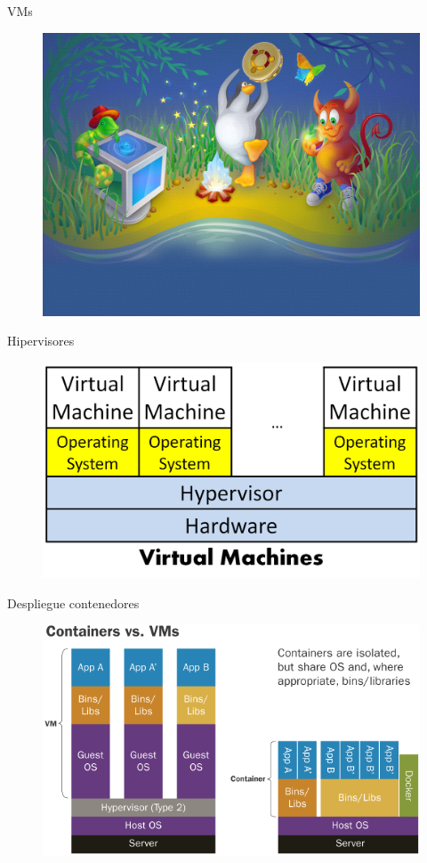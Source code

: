 \documentclass[aspectratio=169]{beamer}
\begin{document}
\begin{frame}{VMs}
    \begin{figure}
        \centering
        \includegraphics[width=0.6\linewidth]{Images/virtualbox}
        \label{fig:vm}
    \end{figure}
\end{frame}


\begin{frame}{Hipervisores}
    \begin{figure}
        \centering
        \includegraphics[width=0.6\linewidth]{Images/hypervisors}
        \label{fig:hypervisors}
    \end{figure}
\end{frame}

\begin{frame}{Despliegue contenedores}
    \begin{figure}
        \centering
        \includegraphics[width=0.7\linewidth]{Images/containervsvm.png}
        \label{fig:containervsvm}
    \end{figure}
\end{frame}
\end{document}
